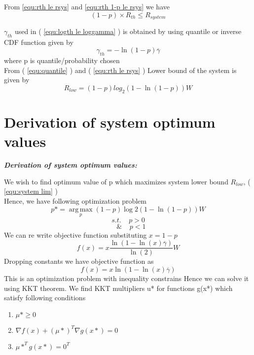 \documentclass[conference]{IEEEtran}
\begin{document}
From \ref{equ:rth le rsys} and \ref{equ:rth 1-p  le rsys}
 we have  
\begin{equation}
\left( 1-p \right)\times {{R}_{th}} \le {{R}_{system}}
\end{equation}

${{\gamma}_{th}}$ used in ( \ref{equ:logth le loggamma} ) is obtained by using quantile or inverse CDF function given by 
\begin{equation}  \label{equ:quantile}
{{\gamma }_{th}}=-\ln \left( 1-p \right)\overline{\gamma } 
\end{equation}
where p is quantile/probability  chosen\\ 

From ( \ref{equ:quantile} ) and ( \ref{equ:rth le rsys} ) Lower bound of the system is given by  
\begin{equation} \label{equ:system lim}
{{R}_{low}}=(1-p){{log}_{2}}(1-\ln (1-p))W 
\end{equation}
 
\vspace{25pt} 
 

\section{Derivation of system optimum values}
\label{Appendix:optimzation}
\textbf{\emph{Derivation of system optimum values:}}

\vspace{25pt}

We wish to find optimum value of p which maximizes system lower bound ${{R}_{low}}$, ( \ref{equ:system lim} )\\

Hence, we have following optimization problem 
\[p*=\operatorname*{arg\,max}_p (1-p)\log 2(1-\ln (1-p))W\] 
\[{s.t.}\;\;\;\;{    p>0}\]
\[\;\;\;{  \& }   \;\;\;\;   {p<1}\] 
We can re write objective function substituting $x=1-p$ 
\[f\left( x \right)=x\frac{\ln (1-\ln (x)\overline{\gamma })}{\ln \left( 2 \right)}W\] 
Dropping constants we have objective function as 
\[f\left( x \right)=x\ln \left( 1-\ln \left( x \right)\overline{\gamma } \right)\] 
This is an optimization problem with inequality constrains
Hence we can solve it using KKT theorem.
We find KKT multipliers u* for functions g(x*) which satisfy following conditions

\begin{enumerate}


\item $\mu *\ge 0$
\item $\nabla f\left( x \right)+{{\left( \mu * \right)}^{T}}\nabla g\left( x* \right)=0$
\item $\mu {{*}^{T}}g(x*)={{0}^{T}}$
\end{enumerate} 
 
\end{document}
